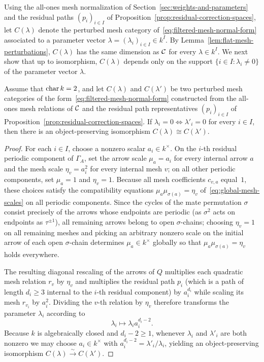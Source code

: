 Using the all-ones mesh normalization of Section~\ref{sec:weights-and-parameters} and the residual paths $(p_i)_{i\in I}$ of Proposition~\ref{prop:residual-correction-spaces}, let $C(\lambda)$ denote the perturbed mesh category of~\eqref{eq:filtered-mesh-normal-form} associated to a parameter vector $\lambda=(\lambda_i)_{i\in I}\in k^I$. By Lemma~\ref{lem:flat-mesh-perturbations}, $C(\lambda)$ has the same dimension as $\mathcal C$ for every $\lambda\in k^I$. We next show that up to isomorphism, $C(\lambda)$ depends only on the support $\{i\in I:\lambda_i\ne0\}$ of the parameter vector $\lambda$.

\begin{lemma}
\label{lem:same-support-forms}
Assume that $\operatorname{char} k=2$, and let $C(\lambda)$ and $C(\lambda')$ be two perturbed mesh categories of the form~\eqref{eq:filtered-mesh-normal-form} constructed from the all-ones mesh relations of $\mathcal C$ and the residual path representatives $(p_i)_{i\in I}$ of Proposition~\ref{prop:residual-correction-spaces}. If $\lambda_i=0\iff\lambda'_i=0$ for every $i\in I$, then there is an object-preserving isomorphism $C(\lambda)\cong C(\lambda')$.
\end{lemma}
\begin{proof}
For each $i\in I$, choose a nonzero scalar $a_i\in k^\times$. On the $i$-th residual periodic component of $\Gamma_A$, set the arrow scale $\mu_a=a_i$ for every internal arrow $a$ and the mesh scale $\eta_v=a_i^2$ for every internal mesh $v$; on all other periodic components, set $\mu_a=1$ and $\eta_v=1$. Because all mesh coefficients $c_{v,a}$ equal~$1$, these choices satisfy the compatibility equations $\mu_a\mu_{\sigma(a)}=\eta_v$ of~\eqref{eq:global-mesh-scales} on all periodic components. Since the cycles of the mate permutation $\sigma$ consist precisely of the arrows whose endpoints are periodic (as $\sigma^2$ acts on endpoints as $\tau^{\pm1}$), all remaining arrows belong to open $\sigma$-chains; choosing $\eta_v=1$ on all remaining meshes and picking an arbitrary nonzero scale on the initial arrow of each open $\sigma$-chain determines $\mu_a\in k^\times$ globally so that $\mu_a\mu_{\sigma(a)}=\eta_v$ holds everywhere.

The resulting diagonal rescaling of the arrows of $Q$ multiplies each quadratic mesh relation $r_v$ by $\eta_v$ and multiplies the residual path $p_i$ (which is a path of length $d_i\geq3$ internal to the $i$-th residual component) by $a_i^{d_i}$ while scaling its mesh $r_{v_i}$ by $a_i^2$. Dividing the $v$-th relation by $\eta_v$ therefore transforms the parameter $\lambda_i$ according to
\[
  \lambda_i\longmapsto \lambda_i a_i^{d_i-2}.
\]
Because $k$ is algebraically closed and $d_i-2\geq1$, whenever $\lambda_i$ and $\lambda'_i$ are both nonzero we may choose $a_i\in k^\times$ with $a_i^{d_i-2}=\lambda'_i/\lambda_i$, yielding an object-preserving isomorphism $C(\lambda)\xrightarrow{\sim}C(\lambda')$.
\end{proof}

